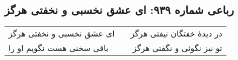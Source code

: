 \begin{center}
\section*{رباعی شماره ۹۳۹: ای عشق نخسبی و نخفتی هرگز}
\label{sec:0939}
\begin{longtable}{l p{0.5cm} r}
ای عشق نخسبی و نخفتی هرگز
&&
در دیدهٔ خفتگان نیفتی هرگز
\\
باقی سخنی هست نگویم او را
&&
تو نیز نگوئی و نگفتی هرگز
\\
\end{longtable}
\end{center}
